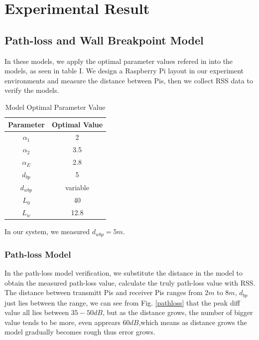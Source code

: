 \documentclass[10pt,conference]{IEEEtran}
\begin{document}

\section{Experimental Result}
\subsection{Path-loss and Wall Breakpoint Model}
In these models, we apply the optimal parameter values refered in \cite{site} into the models, as seen in table I. We design a Raspberry Pi layout in our experiment environments and measure the distance between Pis, then we collect RSS data to verify the models.

\begin{table}[!hbp]
\centering
\caption{Model Optimal Parameter Value}
\begin{tabular}{|c|c|}
\hline
Parameter & Optimal Value \\
\hline
$\alpha_1$ & 2 \\
\hline
$\alpha_2$ & 3.5 \\
\hline
$\alpha_E$ & 2.8 \\
\hline
$d_{bp}$ & 5 \\
\hline
$d_{wbp}$ & variable \\
\hline
$L_{0}$ & 40 \\
\hline
$L_{w}$ & 12.8 \\
\hline
\end{tabular}
\end{table}

In our system, we measured $d_{wbp}=5m$. \\
\subsubsection{Path-loss Model}
In the path-loss model verification, we substitute the distance in the model to obtain the measured path-loss value, calculate the truly path-loss value with RSS. The distance between transmitt Pis and receiver Pis ranges from $2m$ to $8m$, $d_{bp}$ just lies between the range, we can see from Fig. \ref{pathloss} that the peak diff value all lies between $35-50dB$, but as the distance grows, the number of bigger value tends to be more, even apprears $60dB$,which means as distance grows the model gradually becomes rough thus error grows.
\end{document}
